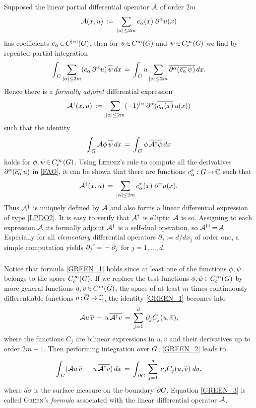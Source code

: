 \documentclass[11pt,twoside]{article}
\begin{document}
\subparagraph*{}
Supposed the linear partial differential operator ${\mathcal{A}}$ of order $2m$
\begin{equation}\label{LPDO2}
\DO(x,u) \eqdef
\sum_{\abs{\alpha} \leq 2m} c_{\alpha}(x) \; \PA u(x)
\end{equation}
has coefficients $c_{\alpha} \xeof C^{\abs{\alpha} }(\G)$,
then for $u {\,\in\,} C^m(G)$ and $\psi {\,\in\,} C_c^{\infty}(G)$
we find by repeated partial integration
\[
\int_{\,\G} \sum_{\abs{\alpha} \leq 2m}
(c_{\alpha} \, \PA u) \, \overline{\psi} \, dx
\=
\int_{\,\G} u \sum_{\abs{\alpha} \leq 2m}
\overline{\PA(\overline{c_{\alpha}} \, \psi)} \, dx.
\]
Hence there is a \textit{formally adjoint} differential expression
\begin{equation}\label{FAO}
\DO^{\dag}(x,u) \eqdef
\sum_{\abs{\alpha} \leq 2m} (-1)^{\abs{\alpha} }
\PA(\overline{c_{\alpha}(x)} \, u(x))
\end{equation}
such that the identity
\begin{equation}\label{GREEN_1}
\int_{\,G} {\mathcal{A}} \phi \, \overline{\psi} \, dx 
\,=\,
\int_{\,G} \phi \, \overline{{\mathcal{A}}^{\dag} \psi} \, dx 
\end{equation}
holds for $\phi,\psi {\,\in\,} C_c^{\infty}(G)$.
Using \textsc{Leibniz}'s rule to compute all the derivatives
$\partial^{\alpha}(\overline{c_{\alpha}} \, u)$ in \eqref{FAO},
it can be shown
that there are functions $c_{\alpha}^*:G {\,\to\,} {\mathbb{C}}$
such that %
\[
\DO^{\dag}(x,u) \=
\sum_{\abs{\alpha} \leq 2m}
c_{\alpha}^*(x) \; \PA u(x).
\]
Thus ${\mathcal{A}}^{\dag}$ is uniquely defined by ${\mathcal{A}}$
and also forms a linear differential expression of type \eqref{LPDO2}.
It is easy to verify that ${\mathcal{A}}^{\dag}$ is elliptic \iff ${\mathcal{A}}$ is so.
Assigning to each expression ${\mathcal{A}}$
its formally adjoint ${\mathcal{A}}^{\dag}$ is a self-dual operation,
so ${\mathcal{A}}^{{\dag}{\dag}} {\,=\,} {\mathcal{A}}$.
Especially
for all \textit{elementary} differential operators $\partial_j := d/dx_j$
of order one,
a simple computation yields
${\partial_j}^{\dag} {\,=\,} - \partial_j$ for $j=1,\ldots,d$.

\subparagraph*{}
Notice that formula \eqref{GREEN_1} holds
since at least one of the functions $\phi,\psi$ belongs to the space $C_c^{\infty}(G)$. 
If we replace the test functions $\phi,\psi {\,\in\,} C_c^{\infty}(G)$
by more general functions $u,v {\,\in\,} C^m(\overline{G})$,
the space of at least $m$-times continuously differentiable functions
$u{\,:\,}\overline{G} {\,\to\,} {\mathbb{C}}$,
the identity \eqref{GREEN_1} becomes into
\begin{equation}\label{GREEN_2}
{\mathcal{A}} u \, \overline{v} \, - \, u \, \overline{{\mathcal{A}}^{\dag} v}
\,=\, 
\sum_{j=1}^d \, \partial_j C_j(u, \overline{v}),
\end{equation}
where the functions $C_j$ are bilinear expressions
in $u,\overline{v}$ and their derivatives up to order $2m-1$. 
Then performing integration over $G$,
\eqref{GREEN_2} leads to
\begin{equation}\label{GREEN_3}
\int_{\,G}
({\mathcal{A}} u \, \overline{v} \, - \, u \, \overline{{\mathcal{A}}^{\dag} v}) \, dx
\,=\, 
\int_{\,\partial G} \, \sum_{j=1}^d \, \nu_j C_j(u,\overline{v}) \; d\sigma,
\end{equation}
where $d\sigma$ is the surface measure on the boundary $\partial G$.
Equation \eqref{GREEN_3} is called \textsc{Green}\textit{'s formula}
associated with the linear differential operator ${\mathcal{A}}$.
\end{document}
